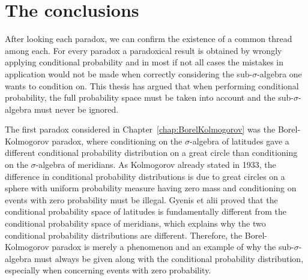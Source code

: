 \documentclass[a4paper]{report}
\theoremstyle{plain}
\theoremstyle{definition}
\theoremstyle{remark}
\numberwithin{equation}{chapter}
\DeclareMathOperator{\1}{\mathbbm{1}}
\begin{document}
\chapter{The conclusions}
After looking each paradox, we can confirm the existence of a common thread among each. For every paradox a paradoxical result is obtained by wrongly applying conditional probability and in most if not all cases the mistakes in application would not be made when correctly considering the sub-$\sigma$-algebra one wants to condition on. This thesis has argued that when performing conditional probability, the full probability space must be taken into account and the sub-$\sigma$-algebra must never be ignored.

The first paradox considered in Chapter~\ref{chap:BorelKolmogorov} was the Borel-Kolmogorov paradox, where conditioning on the $\sigma$-algebra of latitudes gave a different conditional probability distribution on a great circle than conditioning on the $\sigma$-algebra of meridians. As Kolmogorov \cite{Kolmogorov33} already stated in 1933, the difference in conditional probability distributions is due to great circles on a sphere with uniform probability measure having zero mass and conditioning on events with zero probability must be illegal. Gyenis et alii \cite{Gyenis17} proved that the conditional probability space of latitudes is fundamentally different from the conditional probability space of meridians, which explains why the two conditional probability distributions are different. Therefore, the Borel-Kolmogorov paradox is merely a phenomenon and an example of why the sub-$\sigma$-algebra must always be given along with the conditional probability distribution, especially when concerning events with zero probability.
\end{document}
